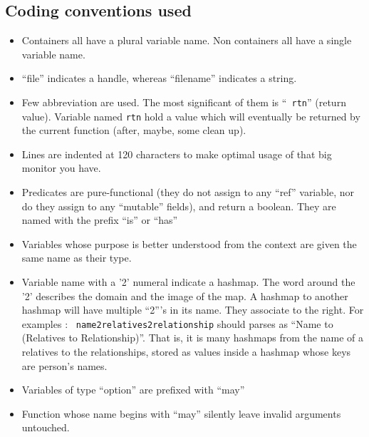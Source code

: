 \documentclass[11pt]{article}
\begin{document}
\begin{enumerate}
  
\section{Coding conventions used}


\begin{itemize}
\item Containers all have a plural variable name. Non containers all
  have a single variable name.

\item ``file'' indicates a handle, whereas ``filename'' indicates a string.

\item Few abbreviation are used. The most significant of them is ``{\tt
        rtn}'' (return value). Variable named {\tt rtn} hold a value
        which will eventually be returned by the current function
        (after, maybe, some clean up).

\item Lines are indented at 120 characters to make optimal usage of
  that big monitor you have.

\item Predicates are pure-functional (they do not assign to any
  ``ref'' variable, nor do they assign to any ``mutable'' fields), and
  return a boolean. They are named with the prefix ``is'' or ``has''

\item Variables whose purpose is better understood from the context are
  given the same name as their type.

\item Variable name with a '2' numeral indicate a hashmap.  The word
  around the '2' describes the domain and the image of the map. A
  hashmap to another hashmap will have multiple ``2'''s in its name.
  They associate to the right. For examples : {\tt
  name2relatives2relationship} should parses as ``Name to (Relatives to
  Relationship)''.  That is, it is many hashmaps from the name of a
  relatives to the relationships, stored as values inside a hashmap
  whose keys are person's names.
  
  
\item Variables of type ``option'' are prefixed with ``may''

\item Function whose name begins with ``may'' silently leave invalid
  arguments untouched.

\end{itemize}


\end{enumerate}
\end{document}
